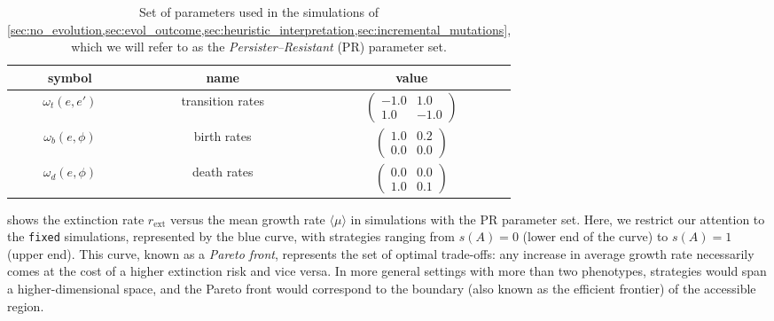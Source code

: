 \documentclass[aps,pre,reprint,10pt,superscriptaddress]{revtex4-2}
\begin{document}
\begin{table}
    \begin{tabular}{c c c}
        \toprule
        symbol             & name             & value                                            \\
        \midrule
        $\omega_t(e,e')$   & transition rates & $\begin{pmatrix}-1.0&1.0\\1.0&-1.0\end{pmatrix}$ \\
        \addlinespace
        $\omega_b(e,\phi)$ & birth rates      & $\begin{pmatrix}1.0&0.2\\0.0&0.0\end{pmatrix}$   \\
        \addlinespace
        $\omega_d(e,\phi)$ & death rates      & $\begin{pmatrix}0.0&0.0\\1.0&0.1\end{pmatrix}$   \\
        \bottomrule
    \end{tabular}
    \caption{Set of parameters used in the simulations of \cref{sec:no_evolution,sec:evol_outcome,sec:heuristic_interpretation,sec:incremental_mutations}, which we will refer to as the \emph{Persister--Resistant} (PR) parameter set.} \label{tab:PR_parameters}
\end{table}

 shows the extinction rate $r_\text{ext}$ versus the mean growth rate $\langle\mu\rangle$ in simulations with the PR parameter set. Here, we restrict our attention to the \texttt{fixed} simulations, represented by the blue curve, with strategies ranging from $s(A)=0$ (lower end of the curve) to $s(A)=1$ (upper end). This curve, known as a \emph{Pareto front}, represents the set of optimal trade-offs: any increase in average growth rate necessarily comes at the cost of a higher extinction risk and vice versa. In more general settings with more than two phenotypes, strategies would span a higher-dimensional space, and the Pareto front would correspond to the boundary (also known as the efficient frontier) of the accessible region.
\end{document}
